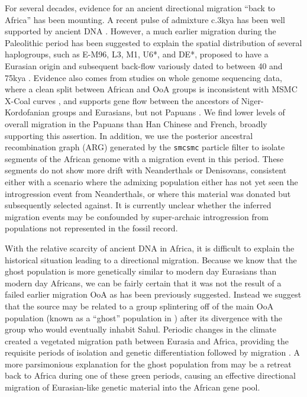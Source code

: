\documentclass{article}
\begin{document}
For several decades, evidence for an ancient directional migration ``back to Africa'' has been mounting. A recent pulse of admixture c.3kya has been well supported by ancient DNA \cite{Lopez2015, GallegoLlorente2015}. However, a much earlier migration during the Paleolithic period has been suggested to explain the spatial distribution of several haplogroups, such as E-M96, L3, M1, U6*, and DE*, proposed to have a Eurasian origin and subsequent back-flow variously dated to between 40 and 75kya \cite{Altheide1997, Hammer1998, Cruciani2002, Chandrasekar2007, Cabrera2018, Hervella2016, Haber2019}. Evidence also comes from studies on whole genome sequencing data, where a clean split between African and OoA groups is inconsistent with MSMC X-Coal curves \cite{Schiffels2014}, and supports gene flow between the ancestors of Niger-Kordofanian groups and Eurasians, but not Papuans \cite{Malaspinas2016}. We find lower levels of overall migration in the Papuans than Han Chinese and French, broadly supporting this assertion. In addition, we use the posterior ancestral recombination graph (ARG) generated by the {\tt smcsmc} particle filter to isolate segments of the African genome with a migration event in this period. These segments do not show more drift with Neanderthals or Denisovans, consistent either with a scenario where the admixing population either has not yet seen the introgression event from Neanderthals, or where this material was donated but subsequently selected against. It is currently unclear whether the inferred migration events may be confounded by super-archaic introgression \cite{Durvasula2019, Lachance2012} from populations not represented in the fossil record.  

With the relative scarcity of ancient DNA in Africa, it is difficult to explain the historical situation leading to a directional migration. Because we know that the ghost population is more genetically similar to modern day Eurasians than modern day Africans, we can be fairly certain that it was not the result of a failed earlier migration OoA as has been previously suggested. Instead we suggest that the source may be related to a group splintering off of the main OoA population (known as a ``ghost'' population in \cite{Malaspinas2016}) after its divergence with the group who would eventually inhabit Sahul. Periodic changes in the climate created a vegetated migration path between Eurasia and Africa, providing the requisite periods of isolation and genetic differentiation followed by migration \cite{Timmermann2016}. A more parsimonious explanation for the ghost population from \cite{Malaspinas2016} may be a retreat back to Africa during one of these green periods, causing an effective directional migration of Eurasian-like genetic material into the African gene pool.
\end{document}
